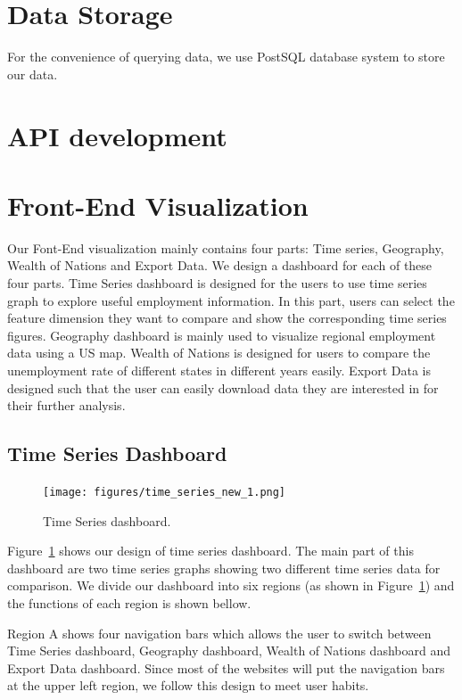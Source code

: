\documentclass{sigchi}
\begin{document}
\section{Data Storage}
For the convenience of querying data, we use PostSQL database system to store our data.

\section{API development}


\section{Front-End Visualization}
Our Font-End visualization mainly contains four parts: Time series, Geography, Wealth of Nations and Export Data. We design a dashboard for each of these four parts. Time Series dashboard is designed for the users to use time series graph to explore useful employment information. In this part, users can select the feature dimension they want to compare and show the corresponding time series figures. Geography dashboard is mainly used to visualize regional employment data using a US map.  Wealth of Nations is designed for users to compare the unemployment rate of different states in different years easily. Export Data is designed such that the user can easily download data they are interested in for their further analysis.


\subsection{Time Series Dashboard}
\begin{figure}[!htbp]
\centering
\texttt{[image: figures/time\_series\_new\_1.png]}
\caption{Time Series dashboard.}
\label{fig:time_series}
\end{figure}
Figure~\ref{fig:time_series} shows our design of time series dashboard. The main part of this dashboard are two time series graphs showing two different time series data for comparison. We divide our dashboard into six regions (as shown in Figure~\ref{fig:time_series}) and the functions of each region is shown bellow.

Region A shows four navigation bars which allows the user to switch between Time Series dashboard, Geography dashboard, Wealth of Nations dashboard and Export Data dashboard. Since most of the websites will put the navigation bars at the upper left region, we follow this design to meet user habits.
\end{document}
